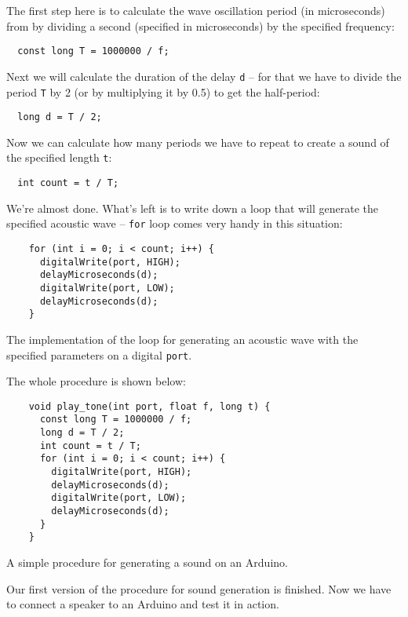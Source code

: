 \documentclass[../sparc.tex]{subfiles}
\begin{document}
The first step here is to calculate the wave oscillation period (in
microseconds) from by dividing a second (specified in microseconds) by the
specified frequency:

\begin{verbatim}
  const long T = 1000000 / f;
\end{verbatim}

Next we will calculate the duration of the delay \texttt{d} -- for that we have
to divide the period \texttt{T} by 2 (or by multiplying it by 0.5) to get the
half-period:

\begin{verbatim}
  long d = T / 2;
\end{verbatim}

Now we can calculate how many periods we have to repeat to create a sound of the
specified length \texttt{t}:

\begin{verbatim}
  int count = t / T;
\end{verbatim}

We're almost done.  What's left is to write down a loop that will generate the
specified acoustic wave -- \texttt{for} loop comes very handy in this situation:

\begin{listing}[H]
  \begin{verbatim}
    for (int i = 0; i < count; i++) {
      digitalWrite(port, HIGH);
      delayMicroseconds(d);
      digitalWrite(port, LOW);
      delayMicroseconds(d);
    }
  \end{verbatim}
  \label{listing:play-tone-cycle}
  \caption{The implementation of the loop for generating an acoustic wave with
    the specified parameters on a digital \texttt{port}.}
\end{listing}

The whole procedure is shown below:
\begin{listing}[H]
  \begin{verbatim}
    void play_tone(int port, float f, long t) {
      const long T = 1000000 / f;
      long d = T / 2;
      int count = t / T;
      for (int i = 0; i < count; i++) {
        digitalWrite(port, HIGH);
        delayMicroseconds(d);
        digitalWrite(port, LOW);
        delayMicroseconds(d);
      }
    }
  \end{verbatim}
  \label{listing:play-tone-procedure}
  \caption{A simple procedure for generating a sound on an Arduino.}
\end{listing}

Our first version of the procedure for sound generation is finished.  Now we
have to connect a speaker to an Arduino and test it in action.

\end{document}

